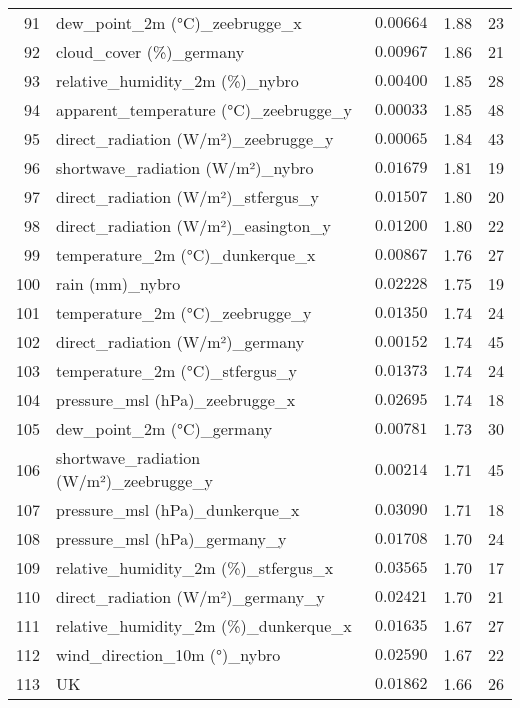 \begin{table}[H]
\begin{tabular}{r l l l l}
        91 & dew\_point\_2m (°C)\_zeebrugge\_x & $0.00664$ & 1.88 & 23 \\
        92 & cloud\_cover (\%)\_germany & $0.00967$ & 1.86 & 21 \\
        93 & relative\_humidity\_2m (\%)\_nybro & $0.00400$ & 1.85 & 28 \\
        94 & apparent\_temperature (°C)\_zeebrugge\_y & $0.00033$ & 1.85 & 48 \\
        95 & direct\_radiation (W/m²)\_zeebrugge\_y & $0.00065$ & 1.84 & 43 \\
        96 & shortwave\_radiation (W/m²)\_nybro & $0.01679$ & 1.81 & 19 \\
        97 & direct\_radiation (W/m²)\_stfergus\_y & $0.01507$ & 1.80 & 20 \\
        98 & direct\_radiation (W/m²)\_easington\_y & $0.01200$ & 1.80 & 22 \\
        99 & temperature\_2m (°C)\_dunkerque\_x & $0.00867$ & 1.76 & 27 \\
        100 & rain (mm)\_nybro & $0.02228$ & 1.75 & 19 \\
        101 & temperature\_2m (°C)\_zeebrugge\_y & $0.01350$ & 1.74 & 24 \\
        102 & direct\_radiation (W/m²)\_germany & $0.00152$ & 1.74 & 45 \\
        103 & temperature\_2m (°C)\_stfergus\_y & $0.01373$ & 1.74 & 24 \\
        104 & pressure\_msl (hPa)\_zeebrugge\_x & $0.02695$ & 1.74 & 18 \\
        105 & dew\_point\_2m (°C)\_germany & $0.00781$ & 1.73 & 30 \\
        106 & shortwave\_radiation (W/m²)\_zeebrugge\_y & $0.00214$ & 1.71 & 45 \\
        107 & pressure\_msl (hPa)\_dunkerque\_x & $0.03090$ & 1.71 & 18 \\
        108 & pressure\_msl (hPa)\_germany\_y & $0.01708$ & 1.70 & 24 \\
        109 & relative\_humidity\_2m (\%)\_stfergus\_x & $0.03565$ & 1.70 & 17 \\
        110 & direct\_radiation (W/m²)\_germany\_y & $0.02421$ & 1.70 & 21 \\
        111 & relative\_humidity\_2m (\%)\_dunkerque\_x & $0.01635$ & 1.67 & 27 \\
        112 & wind\_direction\_10m (°)\_nybro & $0.02590$ & 1.67 & 22 \\
        113 & UK & $0.01862$ & 1.66 & 26 \\

\end{tabular}
\end{table}
